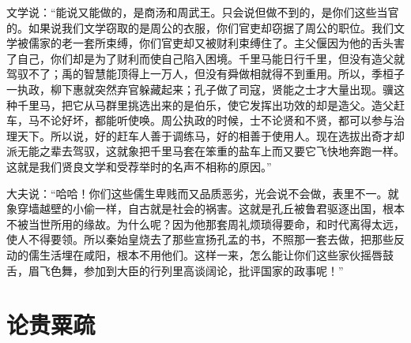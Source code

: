 \documentclass[12pt,UTF-8,openany,a4]{ctexbook}
\begin{document}
\begin{large}
    文学说：“能说又能做的，是商汤和周武王。只会说但做不到的，是你们这些当官的。如果说我们文学窃取的是周公的衣服，你们官吏却窃据了周公的职位。我们文学被儒家的老一套所束缚，你们官吏却又被财利束缚住了。主父偃因为他的舌头害了自己，你们却是为了财利而使自己陷入困境。千里马能日行千里，但没有造父就驾驭不了；禹的智慧能顶得上一万人，但没有舜做相就得不到重用。所以，季桓子一执政，柳下惠就突然弃官躲藏起来；孔子做了司寇，贤能之士才大量出现。骥这种千里马，把它从马群里挑选出来的是伯乐，使它发挥出功效的却是造父。造父赶车，马不论好坏，都能听使唤。周公执政的时候，士不论贤和不贤，都可以参与治理天下。所以说，好的赶车人善于调练马，好的相善于使用人。现在选拔出奇才却派无能之辈去驾驭，这就象把千里马套在笨重的盐车上而又要它飞快地奔跑一样。这就是我们贤良文学和受荐举时的名声不相称的原因。”
    
    大夫说：“哈哈！你们这些儒生卑贱而又品质恶劣，光会说不会做，表里不一。就象穿墙越壁的小偷一样，自古就是社会的祸害。这就是孔丘被鲁君驱逐出国，根本不被当世所用的缘故。为什么呢？因为他那套周礼烦琐得要命，和时代离得太远，使人不得要领。所以秦始皇烧去了那些宣扬孔孟的书，不照那一套去做，把那些反动的儒生活埋在咸阳，根本不用他们。这样一来，怎么能让你们这些家伙摇唇鼓舌，眉飞色舞，参加到大臣的行列里高谈阔论，批评国家的政事呢！”
    

\end{large}



\chapter{论贵粟疏}
\end{document}
